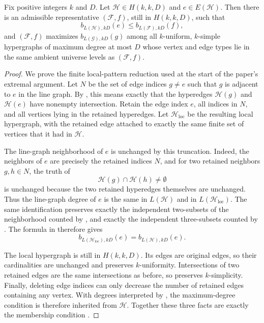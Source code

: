\begin{helper}
Fix positive integers $k$ and $D$.  Let $\mathcal H\in H(k,k,D)$ and
$e\in E(\mathcal H)$.  Then there is an admissible representative
$(\mathcal F,f)$, still in $H(k,k,D)$, such that
\[
b_{L(\mathcal H),kD}(e)\le b_{L(\mathcal F),kD}(f),
\]
and $(\mathcal F,f)$ maximizes $b_{L(\mathcal G),kD}(g)$ among all
$k$-uniform, $k$-simple hypergraphs of maximum degree at most $D$ whose
vertex and edge types lie in the same ambient universe levels as
$(\mathcal F,f)$.
\end{helper}
\begin{proof}
We prove the finite local-pattern reduction used at the start of the
paper's extremal argument.  Let $N$ be the set of edge indices
$g\ne e$ such that $g$ is adjacent to $e$ in the line graph.  By
, this means exactly that the hyperedges
$\mathcal H(g)$ and $\mathcal H(e)$ have nonempty intersection.  Retain the
edge index $e$, all indices in $N$, and all vertices lying in the retained
hyperedges.  Let $\mathcal H_{\mathrm{loc}}$ be the resulting local
hypergraph, with the retained edge attached to exactly the same finite set
of vertices that it had in $\mathcal H$.

The line-graph neighborhood of $e$ is unchanged by this truncation.  Indeed,
the neighbors of $e$ are precisely the retained indices $N$, and for two
retained neighbors $g,h\in N$, the truth of
\[
\mathcal H(g)\cap \mathcal H(h)\ne\emptyset
\]
is unchanged because the two retained hyperedges themselves are unchanged.
Thus the line-graph degree of $e$ is the same in
$L(\mathcal H)$ and in $L(\mathcal H_{\mathrm{loc}})$.  The same
identification preserves exactly the independent two-subsets of the
neighborhood counted by , and exactly the
independent three-subsets counted by .  The
formula in  therefore gives
\[
b_{L(\mathcal H_{\mathrm{loc}}),kD}(e)
=b_{L(\mathcal H),kD}(e).
\]

The local hypergraph is still in $H(k,k,D)$.  Its edges are original edges,
so their cardinalities are unchanged and 
preserves $k$-uniformity.  Intersections of two retained edges are the same
intersections as before, so  preserves
$k$-simplicity.  Finally, deleting edge indices can only decrease the number
of retained edges containing any vertex.  With degrees interpreted by
, the maximum-degree condition
 is therefore inherited from $\mathcal H$.
Together these three facts are exactly the membership condition
.


\end{proof}
